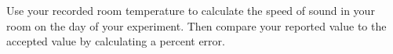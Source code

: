 Use your recorded room temperature to calculate the
speed of sound in your room on the day of your 
experiment.  Then compare your reported value to 
the accepted value by calculating a percent error.
\vfil\eject
\nopagenumbers
{} \vbox{
\hglue-5dd
\vrule height 473.3pt depth 8pt width 0.8pt 
\vglue-482.3pt
\vrule height 473.3pt depth 8pt width 0.1pt 
\vglue-482.3pt
\vrule height 473.3pt depth 8pt width 0.1pt 
\vglue-482.3pt
\vrule height 473.3pt depth 8pt width 0.1pt 
\vglue-482.3pt
\vrule height 473.3pt depth 8pt width 0.1pt 
\vglue-482.3pt
\vrule height 473.3pt depth 8pt width 0.1pt 
\vglue-482.3pt
\vrule height 473.3pt depth 8pt width 0.1pt 
\vglue-482.3pt
\vrule height 473.3pt depth 8pt width 0.1pt 
\vglue-482.3pt
\vrule height 473.3pt depth 8pt width 0.1pt 
\vglue-482.3pt
\vrule height 473.3pt depth 8pt width 0.1pt 
\vglue-482.3pt
\hglue-0.4pt
\vrule height 473.3pt depth 8pt width 0.8pt 
\vglue-482.3pt
\vrule height 473.3pt depth 8pt width 0.1pt 
\vglue-482.3pt
\vrule height 473.3pt depth 8pt width 0.1pt 
\vglue-482.3pt
\vrule height 473.3pt depth 8pt width 0.1pt 
\vglue-482.3pt
\vrule height 473.3pt depth 8pt width 0.1pt 
\vglue-482.3pt
\vrule height 473.3pt depth 8pt width 0.1pt 
\vglue-482.3pt
\vrule height 473.3pt depth 8pt width 0.1pt 
\vglue-482.3pt
\vrule height 473.3pt depth 8pt width 0.1pt 
\vglue-482.3pt
\vrule height 473.3pt depth 8pt width 0.1pt 
\vglue-482.3pt
\vrule height 473.3pt depth 8pt width 0.1pt 
\vglue-482.3pt
\hglue-0.4pt
\vrule height 473.3pt depth 8pt width 0.8pt 
\vglue-482.3pt
\vrule height 473.3pt depth 8pt width 0.1pt 
\vglue-482.3pt
\vrule height 473.3pt depth 8pt width 0.1pt 
\vglue-482.3pt
\vrule height 473.3pt depth 8pt width 0.1pt 
\vglue-482.3pt
\vrule height 473.3pt depth 8pt width 0.1pt 
\vglue-482.3pt
\vrule height 473.3pt depth 8pt width 0.1pt 
\vglue-482.3pt
\vrule height 473.3pt depth 8pt width 0.1pt 
\vglue-482.3pt
\vrule height 473.3pt depth 8pt width 0.1pt 
\vglue-482.3pt
\vrule height 473.3pt depth 8pt width 0.1pt 
\vglue-482.3pt
\vrule height 473.3pt depth 8pt width 0.1pt 
\vglue-482.3pt
\hglue-0.4pt
\vrule height 473.3pt depth 8pt width 0.8pt 
\vglue-482.3pt
\vrule height 473.3pt depth 8pt width 0.1pt 
\vglue-482.3pt
\vrule height 473.3pt depth 8pt width 0.1pt 
}

